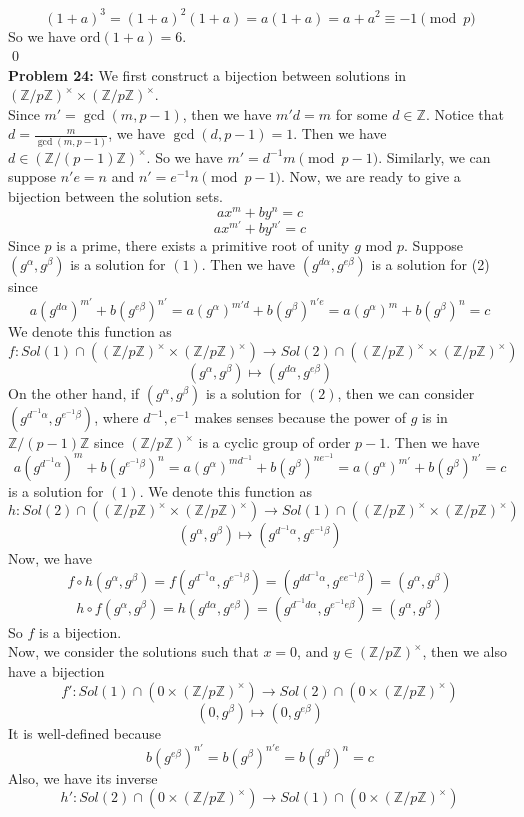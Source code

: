 \documentclass[12pt]{amsart}
\newcommand{\Z}{\mathbb{Z}}
\newcommand{\ord}{\mathrm{ord}}
\begin{document}
$$(1+a)^3=(1+a)^2(1+a)=a(1+a)=a+a^2\equiv -1\pmod p$$ 
So we have $\ord(1+a)=6$.
\\\qed\\
\textbf{Problem 24:} We first construct a bijection between solutions in $(\Z/p\Z)^\times\times (\Z/p\Z)^\times$.\\
Since $m'=\gcd(m,p-1)$, then we have $m'd=m$ for some $d\in \Z$. Notice that $d=\frac{m}{\gcd(m,p-1)}$, we have $\gcd(d,p-1)=1$. Then we have $d\in (\Z/(p-1)\Z)^\times$. So we have $m'=d^{-1}m\pmod {p-1}$. Similarly, we can suppose $n'e=n$ and $n'=e^{-1}n\pmod{p-1}$. Now, we are ready to give a bijection between the solution sets. 
\[ax^m+by^n=c\tag{1}\] 
\[ax^{m'}+by^{n'}=c\tag{2}\] 
Since $p$ is a prime, there exists a primitive root of unity $g$ mod $p$. Suppose $(g^\alpha,g^\beta)$ is a solution for $(1)$. Then we have $(g^{d\alpha},g^{e\beta})$ is a solution for (2) since 
\[a(g^{d\alpha})^{m'}+b(g^{e\beta })^{n'}=a(g^{\alpha})^{m'd}+b(g^{\beta })^{n'e}=a(g^{\alpha})^{m}+b(g^{\beta })^{n}=c\]
We denote this function as 
\[f:Sol(1)\cap((\Z/p\Z)^\times\times (\Z/p\Z)^\times)\to Sol(2)\cap((\Z/p\Z)^\times\times (\Z/p\Z)^\times)\]
\[(g^\alpha,g^\beta)\mapsto(g^{d\alpha},g^{e\beta})\]
On the other hand, if $(g^{\alpha},g^{\beta})$ is a solution for $(2)$, then we can consider $(g^{d^{-1}\alpha},g^{e^{-1}\beta})$, where $d^{-1},e^{-1}$ makes senses because the power of $g$ is in $\Z/(p-1)\Z$ since $(\Z/p\Z)^\times$ is a cyclic group of order $p-1$.
Then we have 
\[a(g^{d^{-1}\alpha})^{m}+b(g^{e^{-1}\beta })^{n}=a(g^{\alpha})^{md^{-1}}+b(g^{\beta })^{ne^{-1}}=a(g^{\alpha})^{m'}+b(g^{\beta })^{n'}=c\]
is a solution for $(1)$.
We denote this function as 
\[h:Sol(2)\cap((\Z/p\Z)^\times\times (\Z/p\Z)^\times)\to Sol(1)\cap((\Z/p\Z)^\times\times (\Z/p\Z)^\times)\]
\[(g^\alpha,g^\beta)\mapsto(g^{d^{-1}\alpha},g^{e^{-1}\beta})\]
Now, we have 
\[f\circ h(g^{\alpha},g^{\beta})=f(g^{d^{-1}\alpha},g^{e^{-1}\beta})=(g^{dd^{-1}\alpha},g^{ee^{-1}\beta})=(g^\alpha,g^\beta)\]
\[h\circ f(g^{\alpha},g^{\beta})=h(g^{d\alpha},g^{e\beta})=(g^{d^{-1}d\alpha},g^{e^{-1}e\beta})=(g^\alpha,g^\beta)\]
So $f$ is a bijection.\\
Now, we consider the solutions such that $x=0$, and $y\in(\Z/p\Z)^\times$, then we also have a bijection 
$$f':Sol(1)\cap (0\times (\Z/p\Z)^\times)\to Sol(2)\cap (0\times (\Z/p\Z)^\times)$$
\[(0,g^\beta)\mapsto (0,g^{e\beta})\]
It is well-defined because 
\[b(g^{e\beta })^{n'}=b(g^{\beta })^{n'e}=b(g^{\beta })^{n}=c\]
Also, we have its inverse 
\[h':Sol(2)\cap(0\times (\Z/p\Z)^\times)\to Sol(1)\cap(0\times (\Z/p\Z)^\times)\]
\end{document}
